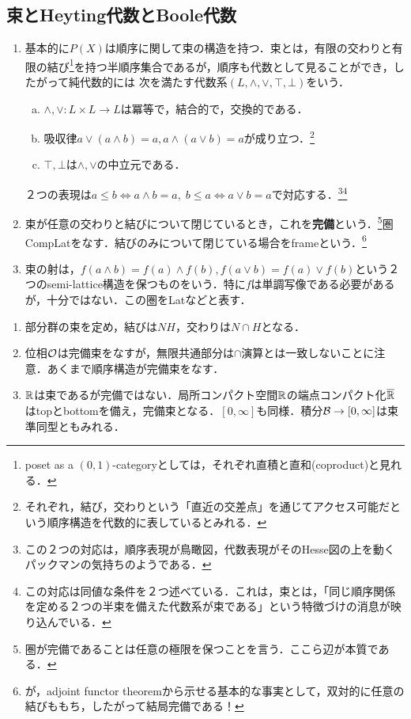\documentclass[uplatex, dvipdfmx]{jsreport}
\begin{document}
\subsection{束とHeyting代数とBoole代数}

\begin{definition}\mbox{}
    \begin{enumerate}
        \item 
    基本的に$P(X)$は順序に関して束の構造を持つ．束とは，有限の交わりと有限の結び\footnote{poset as a $(0,1)$-categoryとしては，それぞれ直積と直和(coproduct)と見れる．}を持つ半順序集合であるが，順序も代数として見ることができ，したがって純代数的には
    次を満たす代数系$(L,\land,\lor,\top,\bot)$をいう．
    \begin{enumerate}[(a)]
        \item $\land,\lor:L\times L\to L$は冪等で，結合的で，交換的である．
        \item 吸収律$a\lor(a\land b)=a,a\land(a\lor b)=a$が成り立つ．\footnote{それぞれ，結び，交わりという「直近の交差点」を通じてアクセス可能だという順序構造を代数的に表しているとみれる．}
        \item $\top,\bot$は$\land,\lor$の中立元である．
    \end{enumerate}
    ２つの表現は$a\le b\Leftrightarrow a\land b=a,\;b\le a\Leftrightarrow a\lor b=a$で対応する．\footnote{この２つの対応は，順序表現が鳥瞰図，代数表現がそのHesse図の上を動くパックマンの気持ちのようである．}\footnote{この対応は同値な条件を２つ述べている．これは，束とは，「同じ順序関係を定める２つの半束を備えた代数系が束である」という特徴づけの消息が映り込んでいる．}
    \item 束が任意の交わりと結びについて閉じているとき，これを\textbf{完備}という．\footnote{圏が完備であることは任意の極限を保つことを言う．ここら辺が本質である．}圏CompLatをなす．結びのみについて閉じている場合をframeという．\footnote{が，adjoint functor theoremから示せる基本的な事実として，双対的に任意の結びももち，したがって結局完備である！}
    \item 束の射は，$f(a\land b)=f(a)\land f(b),f(a\lor b)=f(a)\lor f(b)$という２つのsemi-lattice構造を保つものをいう．特に$f$は単調写像である必要があるが，十分ではない．この圏をLatなどと表す．
    \end{enumerate}
\end{definition}

\begin{example}[束と束準同型の例]\mbox{}\label{exp-lattice}
    \begin{enumerate}
        \item 部分群の束を定め，結びは$NH$，交わりは$N\cap H$となる．
        \item 位相$\mathcal{O}$は完備束をなすが，無限共通部分は$\cap$演算とは一致しないことに注意．あくまで順序構造が完備束をなす．
        \item $\mathbb{R}$は束であるが完備ではない．局所コンパクト空間$\mathbb{R}$の端点コンパクト化$\overline{\mathbb{R}}$はtopとbottomを備え，完備束となる．$[0,\infty]$も同様．積分$\mathcal{B}\to[0,\infty]$は束準同型ともみれる．
    \end{enumerate}
\end{example}
\end{document}
